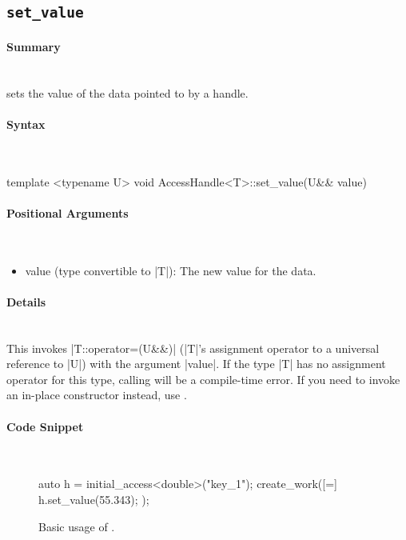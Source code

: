\subsection{\texttt{set\_value}}

\paragraph{Summary} \mbox{}\\
 sets the value of the data pointed to by a
\gls{handle}.

\paragraph{Syntax} \mbox{}\\
\begin{CppCode}
template <typename U>
void AccessHandle<T>::set_value(U&& value)
\end{CppCode}

\paragraph{Positional Arguments}\mbox{}\\
\begin{itemize}
  \item value (type convertible to |T|): The new value for the data.
\end{itemize}

\paragraph{Details}\mbox{}\\
This invokes |T::operator=(U&&)| (|T|'s assignment operator to
a universal reference to |U|) with the argument |value|.  If the type |T| has no
assignment operator for this type, calling  will be a compile-time
error.  If you need to invoke an in-place constructor instead, use .

\paragraph{Code Snippet}\mbox{}\\
\begin{figure}[!h]
\begin{CppCodeNumb}
auto h = initial_access<double>("key_1");
create_work([=]{
  h.set_value(55.343);
});
\end{CppCodeNumb}
\label{fig:fe_api_set_value}
\caption{Basic usage of \protect{}.}
\end{figure}

